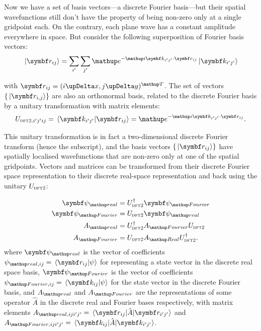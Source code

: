 Now we have a set of basis vectors---a discrete Fourier basis---but their spatial wavefunctions still don't have the property of being non-zero only at a single gridpoint each. On the contrary, each plane wave has a constant amplitude everywhere in space. But consider the following superposition of Fourier basis vectors:
\begin{align}\label{eq:DFT_basischange}
\ket{\vec r_{ij}} = \sum_{i^\prime}\sum_{j^\prime} \ee^{-\ii \vec k_{i^\prime j^\prime} \cdot \vec r_{i j}}\ket{\vec k_{i^\prime j^\prime}}
\end{align}

with $\vec r_{i j} = (i \upDelta x, j \upDelta y)^\up{T}$. The set of vectors $\{\ket{\vec r_{i, j}}\}$ are also an orthonormal basis, related to the discrete Fourier basis by a unitary transformation with matrix elements:
\begin{align}
U_{\textsc{dft2}, i^\prime j^\prime ij} = \braket{\vec k_{i^\prime j^\prime}}{\vec r_{i j}} = \ee^{-\ii \vec k_{i^\prime j^\prime} \cdot \vec r_{i j}}.
\end{align}

This unitary transformation is in fact a two-dimensional discrete Fourier transform (hence the subscript), and the basis vectors $\{\ket{\vec r_{ij}}\}$ have spatially localised wavefunctions that are non-zero only at one of the spatial gridpoints. Vectors and matrices can be transformed from their discrete Fourier space representation to their discrete real-space representation and back using the unitary $U_{\textsc{dft2}}$:

\begin{align}
\vec\psi_\up{real} &= U^\dagger_{\textsc{dft2}} \vec \psi_\up{Fourier}\\
\vec\psi_\up{Fourier} &= U_{\textsc{dft2}} \vec \psi_\up{real}\\
A_\up{real} &= U^\dagger_{\textsc{dft2}} A_\up{Fourier} U_{\textsc{dft2}}\\
A_\up{Fourier} &= U_{\textsc{dft2}} A_\up{Real} U^\dagger_{\textsc{dft2}}.
\end{align}
where $\vec\psi_\up{real}$ is the vector of coefficients $\psi_{\up{real},ij}= \braket{\vec r_{ij}}{\psi}$ for representing a state vector in the discrete real space basis, $\vec\psi_\up{Fourier}$ is the vector of coefficients $\psi_{\up{Fourier}, ij} = \braket{\vec k_{ij}}{\psi}$ for the state vector in the discrete Fourier basis, and $A_\up{real}$ and $A_\up{Fourier}$ are the representations of some operator $\hat A$ in the discrete real and Fourier bases respectively, with matrix elements $A_{\up{real}, ij i^\prime j^\prime} = \matrixel{\vec r_{ij}}{\hat A}{\vec r_{i^\prime j^\prime}}$ and $A_{\up{Fourier},ij i^\prime j^\prime} = \matrixel{\vec k_{ij}}{\hat A}{\vec k_{i^\prime j^\prime}}$.

